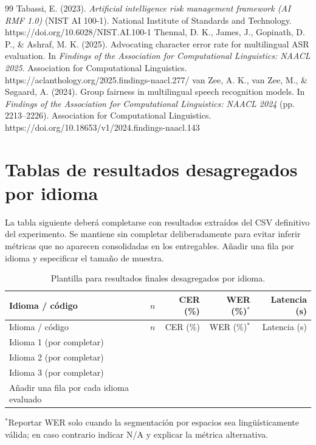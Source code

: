 \documentclass[11pt,letterpaper]{article}
\renewcommand{\arraystretch}{1.15}
\begin{document}
\begin{thebibliography}{99}
 Tabassi, E. (2023). \textit{Artificial intelligence risk management framework (AI RMF 1.0)} (NIST AI 100-1). National Institute of Standards and Technology. https://doi.org/10.6028/NIST.AI.100-1
 Thennal, D. K., James, J., Gopinath, D. P., \& Ashraf, M. K. (2025). Advocating character error rate for multilingual ASR evaluation. In \textit{Findings of the Association for Computational Linguistics: NAACL 2025}. Association for Computational Linguistics. https://aclanthology.org/2025.findings-naacl.277/
 van Zee, A. K., van Zee, M., \& Søgaard, A. (2024). Group fairness in multilingual speech recognition models. In \textit{Findings of the Association for Computational Linguistics: NAACL 2024} (pp. 2213--2226). Association for Computational Linguistics. https://doi.org/10.18653/v1/2024.findings-naacl.143
\end{thebibliography}

\appendix
\small
{}
\renewcommand{\arraystretch}{1.0}


\section{Tablas de resultados desagregados por idioma}
La tabla siguiente deberá completarse con resultados extraídos del CSV definitivo del experimento. Se mantiene sin completar deliberadamente para evitar inferir métricas que no aparecen consolidadas en los entregables. Añadir una fila por idioma y especificar el tamaño de muestra.
\begin{longtable}{p{}r r r r}
\caption{Plantilla para resultados finales desagregados por idioma.}\\
\toprule Idioma / código & $n$ & CER (\%) & WER (\%)$^*$ & Latencia (s)\\\midrule
\endfirsthead
\toprule Idioma / código & $n$ & CER (\%) & WER (\%)$^*$ & Latencia (s)\\\midrule
\endhead
Idioma 1 (por completar) & & & & \\
Idioma 2 (por completar) & & & & \\
Idioma 3 (por completar) & & & & \\
Añadir una fila por cada idioma evaluado & & & & \\
\bottomrule
\end{longtable}
\small $^*$Reportar WER solo cuando la segmentación por espacios sea lingüísticamente válida; en caso contrario indicar N/A y explicar la métrica alternativa.
\end{document}
